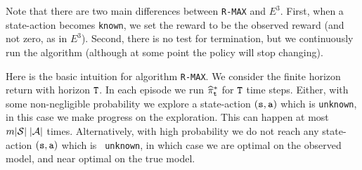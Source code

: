 




Note that there are two main differences between {\tt R-MAX} and $E^3$. First, when a
state-action becomes \texttt{known}, we set the reward to be the observed
reward (and not zero, as in $E^3$). Second, there is no test for
termination, but we continuously run the algorithm (although at
some point the policy will stop changing).


Here is the basic intuition for algorithm {\tt R-MAX}. We consider
the finite horizon return with horizon ${\tt T}$.  In each episode
we run $\widehat{\pi}^*_{\tt t}$ for ${\tt T}$ time steps.
Either, with some non-negligible probability we explore a
state-action $({\tt s},{\tt a})$ which is \texttt{unknown}, in this case
we make progress on the exploration.  This can happen at most
$m|\mathcal{S}|\;|\mathcal{A}|$ times. Alternatively, with high probability
we do not reach any state-action $({\tt s},{\tt a})$ which is {\tt
unknown}, in which case we are optimal on the observed model, and
near optimal on the true model.

